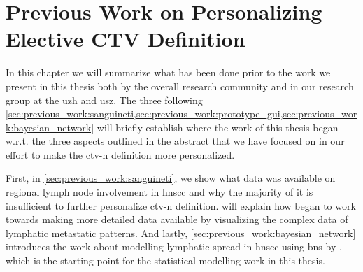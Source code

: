 \documentclass[\relativeRoot/main.tex]{subfiles}
\begin{document}
\chapter[Previous Work on Personalizing CTV-N Definition]{Previous Work on Personalizing Elective CTV Definition}
\label{chap:previous_work}
\globalreset

In this chapter we will summarize what has been done prior to the work we present in this thesis both by the overall research community and in our research group at the \gls{uzh} and \gls{usz}. The three following \cref{sec:previous_work:sanguineti,sec:previous_work:prototype_gui,sec:previous_work:bayesian_network} will briefly establish where the work of this thesis began w.r.t. the three aspects outlined in the abstract that we have focused on in our effort to make the \gls{ctv-n} definition more personalized.

First, in \cref{sec:previous_work:sanguineti}, we show what data was available on regional lymph node involvement in \gls{hnscc} and why the majority of it is insufficient to further personalize \gls{ctv-n} definition.  will explain how  began to work towards making more detailed data available by visualizing the complex data of lymphatic metastatic patterns. And lastly, \cref{sec:previous_work:bayesian_network} introduces the work about modelling lymphatic spread in \gls{hnscc} using \glspl{bn} by , which is the starting point for the statistical modelling work in this thesis.




\end{document}
